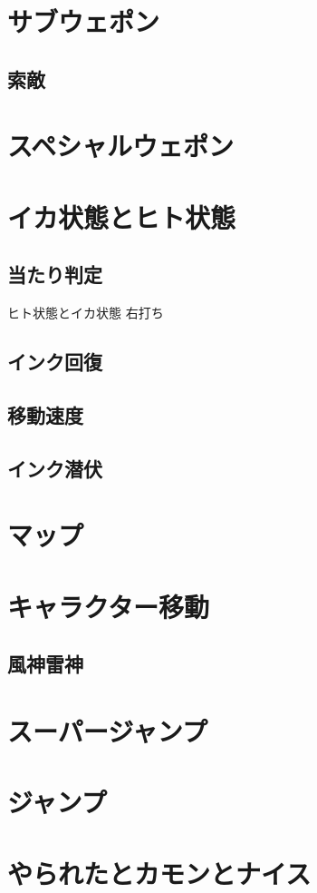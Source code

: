 \documentclass[a4paper,11pt]{jsbook}
\begin{document}
\section{サブウェポン}
\subsection{索敵}
\section{スペシャルウェポン}
\section{イカ状態とヒト状態}
\subsection{当たり判定}
ヒト状態とイカ状態
右打ち
\subsection{インク回復}
\subsection{移動速度}
\subsection{インク潜伏}
\section{マップ}
\section{キャラクター移動}
\subsection{風神雷神}
\section{スーパージャンプ}
\section{ジャンプ}
\section{やられたとカモンとナイス}
\end{document}
